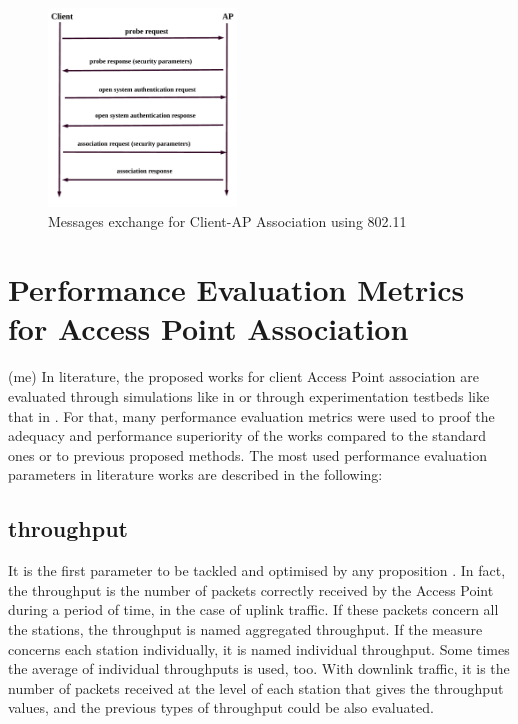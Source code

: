 \documentclass[journal,transmag]{IEEEtran}
\begin{document}
\begin{figure}[t]
\centering
\includegraphics[width=5cm]{Figures/Association_standard.pdf}
\caption{Messages exchange for Client-AP Association using 802.11}
\label{fig:Association_client_Access Point}
\end{figure}

\section{Performance Evaluation Metrics for Access Point Association} (me)
\label{evaluation parameters}
In literature, the proposed works for client Access Point association are evaluated through simulations like in \cite{10approximate_optimisation_proportional,14AP_association_multirate_WLAN,11proportional_fairness_power_control,15Demand_aware_load_balance_WLAN,16throughput_optimisation_association_bandwidth,14optimalAP_INFOCOM,12Network_cooperation_AP_association} or through experimentation testbeds like that in \cite{10Dyson,08Design_high_wifi_entreprise,17building_SDN_entreprise_virtual_AP,16VALI_SDN,15OpenSDWN_home_entreprise_WIFI,14Odin:Programmatic_Orchestration_WiFi,06practical_queue_based_AP_association,15fuzzy_load_balancing_802.11,14load_handoff_SDN}. For that, many performance evaluation metrics were used to proof the adequacy and performance superiority of the works compared to the standard ones or to previous proposed methods. The most used performance evaluation parameters in literature works are described in the following:  

\subsection{throughput}
It is the first parameter to be tackled and optimised by any proposition \cite{10approximate_optimisation_proportional,14AP_association_multirate_WLAN,15Demand_aware_load_balance_WLAN,16throughput_optimisation_association_bandwidth,14optimalAP_INFOCOM,12Network_cooperation_AP_association,11proportional_fairness_power_control}. In fact, the throughput is the number of packets correctly received by the Access Point during a period of time, in the case of uplink traffic. If these packets concern all the stations, the throughput is named aggregated throughput. If the measure concerns each station individually, it is named individual throughput. Some times the average of individual throughputs is used, too. With downlink traffic, it is the number of packets received at the level of each station that gives the throughput values, and the previous types of throughput could be also evaluated. 
\end{document}

